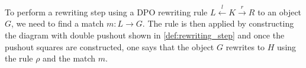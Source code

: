 To perform a rewriting step using a DPO rewriting rule $L \overset{l}{\leftarrow} K \overset{r}{\rightarrow} R$ to an object $G$, we need to find a match $m:L \to G$. The rule is then applied by constructing the diagram with double pushout shown in \autoref{def:rewriting_step} and once the pushout squares are constructed, one says that the object $G$ rewrites to $H$ using the rule $\rho$ and the match $m$. 

